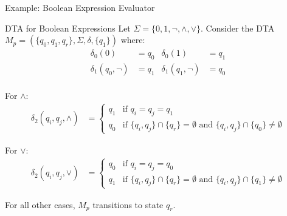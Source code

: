 \documentclass[10pt,svgnames,fragile]{beamer}
\begin{document}
\begin{frame}{Example: Boolean Expression Evaluator}
  \begin{block}{DTA for Boolean Expressions}
    Let $\Sigma = \{0, 1, \neg, \wedge, \vee\}$. Consider the DTA $M_p = (\{q_0, q_1, q_r\}, \Sigma, \delta, \{q_1\})$ where:
    \begin{align*}
      \delta_0(0) &= q_0 & \delta_0(1) &= q_1 \\
      \delta_1(q_0, \neg) &= q_1 & \delta_1(q_1, \neg) &= q_0 \\
    \end{align*}
    
    For $\wedge$:
    \begin{align*}
      \delta_2(q_i, q_j, \wedge) &= 
      \begin{cases}
        q_1 & \text{if } q_i = q_j = q_1 \\
        q_0 & \text{if } \{q_i, q_j\} \cap \{q_r\} = \emptyset \text{ and } \{q_i, q_j\} \cap \{q_0\} \neq \emptyset
      \end{cases}
    \end{align*}
    
    For $\vee$:
    \begin{align*}
      \delta_2(q_i, q_j, \vee) &= 
      \begin{cases}
        q_0 & \text{if } q_i = q_j = q_0 \\
        q_1 & \text{if } \{q_i, q_j\} \cap \{q_r\} = \emptyset \text{ and } \{q_i, q_j\} \cap \{q_1\} \neq \emptyset
      \end{cases}
    \end{align*}
    
    For all other cases, $M_p$ transitions to state $q_r$.
  \end{block}
\end{frame}
\end{document}

